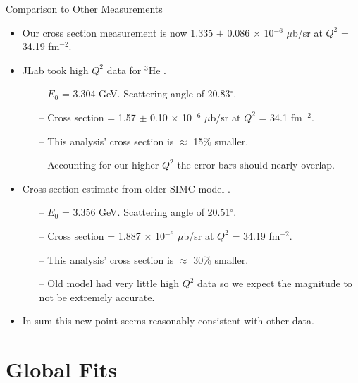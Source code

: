 \documentclass[10pt]{beamer}
\begin{document}
\begin{frame}[fragile]{Comparison to Other Measurements}

	\begin{itemize}
		\item Our cross section measurement is now \alert{1.335 $\pm$ 0.086 $\times$ 10$^{-6}$ $\mu$b/sr} at \alert{$Q^2$ = 34.19 fm$^{-2}$}.
		\pause
		\item {}\alert{JLab} took high $Q^2$ data for $^3$He \cite{Article:Alex}.
			\begin{itemize}
				\item[--] $E_0$ = 3.304 GeV. Scattering angle of 20.83$^{\circ}$. 
				\item[--] Cross section = \alert{1.57 $\pm$ 0.10 $\times$ 10$^{-6}$ $\mu$b/sr} at \alert{$Q^2$ = 34.1 fm$^{-2}$}.
				\item[--] This analysis' cross section is $\approx$ \alert{15$\%$ smaller}. 
				\item[--] Accounting for our higher $Q^2$ the error bars should nearly overlap.
			\end{itemize}
		\pause
		\item Cross section estimate from \alert{older SIMC model} \cite{Article:Amroun}.
			\begin{itemize}
				\item[--] $E_0$ = 3.356 GeV. Scattering angle of 20.51$^{\circ}$.
				\item[--] Cross section = \alert{1.887 $\times$ 10$^{-6}$ $\mu$b/sr} at \alert{$Q^2$ = 34.19 fm$^{-2}$}.
				\item[--] This analysis' cross section is $\approx$ \alert{30$\%$ smaller}.
				\item[--] Old model had \alert{very little high $Q^2$ data} so we expect the magnitude to not be extremely accurate.
			\end{itemize}
		\pause
		\item In sum this new point seems reasonably consistent with other data.
	\end{itemize}

\end{frame}

\section{Global Fits}
\end{document}
